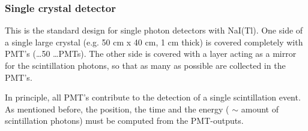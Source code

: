 \subsubsection{Single crystal detector \label{sec:single_crystal}}
This is the standard design for single photon detectors with NaI(Tl). One
side of a single large crystal (e.g. 50 cm x 40 cm, 1 cm thick) is covered
completely with PMT's (\ldots 50 \ldots PMTs). The other side is covered with
a layer acting as a mirror for the scintillation photons, so that as many as
possible are collected in the PMT's.

In principle, all PMT's contribute to the detection of a single
scintillation event. As mentioned before, the position, the time and the
energy ( $\sim$ amount of scintillation photons) must be computed from the
PMT-outputs.
%

